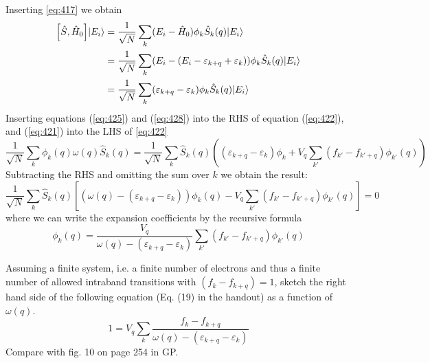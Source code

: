 \begin{solution}
\begin{equation}
\end{equation}
Inserting \eqref{eq:417} we obtain
\begin{align}
    \comm{\hat{S}}{\hat{H}_0}\ket{E_i} &= \frac{1}{\sqrt{N}}\sum_k (E_i - \hat{H}_0) \phi_k \hat{S}_k(q) \ket{E_i}  \\ 
    &= \frac{1}{\sqrt{N}}\sum_k (E_i - (E_i-\varepsilon_{k+q}+\varepsilon_k)) \phi_k \hat{S}_k(q) \ket{E_i} \\&=
    \frac{1}{\sqrt{N}} \sum_k (\varepsilon_{k+q}-\varepsilon_k)
    \phi_k \hat{S}_k(q) \ket{E_i} \label{eq:428}
\end{align}
Inserting equations (\ref{eq:425}) and (\ref{eq:428}) into the RHS of equation (\ref{eq:422}), and (\ref{eq:421}) into the LHS of \eqref{eq:422}
{\small
\begin{equation}
    \dfrac{1}{\sqrt{N}}\sum_k\phi_{k}(q) \omega(q)\hat{S}_k(q) = \frac{1}{\sqrt{N}} \sum_k \hat{S}_{k}(q)\left( (\varepsilon_{k+q}-\varepsilon_k)
    \phi_k + V_q \sum_{k'} (f_{k'} - f_{k'+q}) \phi_{k'}(q)\right)
\end{equation}}
Subtracting the RHS and omitting the sum over $k$ we obtain the result:
\begin{equation}
    \dfrac{1}{\sqrt{N}}\sum_k\hat{S}_{k}(q)\left[\left(\omega(q) - (\varepsilon_{k+q}-\varepsilon_k)\right)\phi_{k}(q) - V_q  \sum_{k'}(f_{k'} - f_{k'+q}) \phi_{k'}(q) \right] = 0
\end{equation}
where we can write the expansion coefficients by the recursive formula
\begin{equation}\label{eq:432}
    \phi_{k}(q) = \dfrac{V_q}{\omega(q) - (\varepsilon_{k+q}-\varepsilon_k)}\sum_{k'}(f_{k'} - f_{k'+q}) \phi_{k'}(q)
\end{equation}

\end{solution}

\begin{exercise}
Assuming a finite system, i.e. a finite number of electrons and thus a finite number of allowed intraband transitions with $(f_{k} - f_{k+q}) = 1$, sketch the right hand side of the following equation (Eq. (19) in the handout) as a function of $\omega(q)$.
\begin{equation}\label{eq:433}
    1 = V_{q}\sum_{k} \dfrac{f_{k}-f_{k+q}}{\omega(q) - (\varepsilon_{k+q} - \varepsilon_k)}
\end{equation}
Compare with fig. 10 on page 254 in GP.
\end{exercise}



